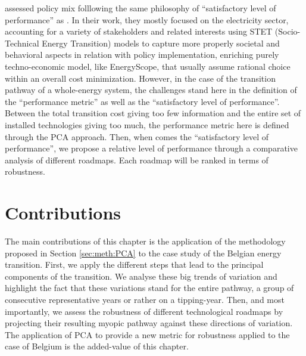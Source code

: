 \citet{castrejon2020making} assessed policy mix folllowing the same philosophy of ``satisfactory level of performance'' as \cite{walker2012deep}. In their work, they mostly focused on the electricity sector, accounting for a variety of stakeholders and related interests using STET (Socio-Technical Energy Transition) models to capture more properly societal and behavioral aspects in relation with policy implementation, enriching purely techno-economic model, like EnergyScope, that usually assume rational choice within an overall cost minimization.  However, in the case of the transition pathway of a whole-energy system, the challenges stand here in the definition of the ``performance metric'' as well as the ``satisfactory level of performance''. Between the total transition cost giving too few information and the entire set of installed technologies giving too much, the performance metric here is defined through the \gls{PCA} approach. Then, when comes the ``satisfactory level of performance'', we propose a relative level of performance through a comparative analysis of different roadmaps. Each roadmap will be ranked in terms of robustness.

\section*{Contributions}
\label{sec:RobPol:contributions}
The main contributions of this chapter is the application of the methodology proposed in Section \ref{sec:meth:PCA} to the case study of the Belgian energy transition. First, we apply the different steps that lead to the principal components of the transition. We analyse these big trends of variation and highlight the fact that these variations stand for the entire pathway, a group of consecutive representative years or rather on a tipping-year. Then, and most importantly, we assess the robustness of different technological roadmaps by projecting their resulting myopic pathway against these directions of variation. The application of \gls{PCA} to provide a new metric for robustness applied to the case of Belgium is the added-value of this chapter.

